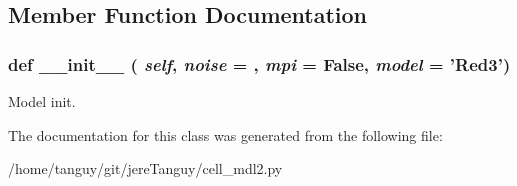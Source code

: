 \subsection{Member Function Documentation}
\hypertarget{classcell__mdl2_1_1temporal__mdl_ac775ee34451fdfa742b318538164070e}{
\subsubsection[{\_\-\_\-init\_\-\_\-}]{\setlength{\rightskip}{0pt plus 5cm}def \_\-\_\-init\_\-\_\- ( {\em self}, \/   {\em noise} = {}, \/   {\em mpi} = {\ttfamily False}, \/   {\em model} = {\ttfamily '{\bf Red3}'})}}
\label{classcell__mdl2_1_1temporal__mdl_ac775ee34451fdfa742b318538164070e}
\begin{DoxyVerb}Model init.\end{DoxyVerb}
 

The documentation for this class was generated from the following file:\begin{DoxyCompactItemize}
\item 
/home/tanguy/git/jereTanguy/cell\_\-mdl2.py\end{DoxyCompactItemize}

